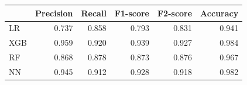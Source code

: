 \begin{tabular}{lrrrrr}
\toprule
 & Precision & Recall & F1-score & F2-score & Accuracy \\
\midrule
LR & 0.737 & 0.858 & 0.793 & 0.831 & 0.941 \\
XGB & 0.959 & 0.920 & 0.939 & 0.927 & 0.984 \\
RF & 0.868 & 0.878 & 0.873 & 0.876 & 0.967 \\
NN & 0.945 & 0.912 & 0.928 & 0.918 & 0.982 \\
\bottomrule
\end{tabular}
